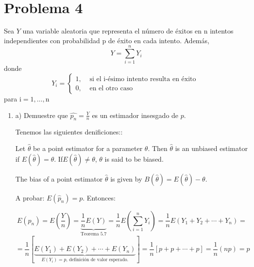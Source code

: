 \section{Problema 4}

Sea $Y$ una variable aleatoria que representa el número de éxitos en $\mathrm{n}$ intentos independientes con probabilidad p de éxito en cada intento. Además,
$$
Y=\sum_{i=1}^{n} Y_{i}
$$
donde
$$
Y_{i}=\begin{cases}
	1  , & \text { si el i-ésimo intento resulta en éxito } \\
	0  , & \text { en el otro caso }
\end{cases}
$$
para $\mathrm{i}=1, \ldots, \mathrm{n}$
\begin{enumerate}
	\item a) Demuestre que $\widehat{p_{n}}=\frac{Y}{n}$ es un estimador insesgado de $p$.
	\begin{solution} Tenemos las siguientes denificiones:: 
		\begin{tcolorbox}[colback=gray!15,colframe=black!1!black,title=Definición 8.2 - Sesgo ]
			Let $\hat{\theta}$ be a point estimator for a parameter $\theta$. Then $\hat{\theta}$  is an unbiased estimator if $E(\hat{\theta})=\theta$. If$E(\hat{\theta})\neq \theta$, $\theta$ is said to be biased.
			\end{tcolorbox}
		
		\begin{tcolorbox}[colback=gray!15,colframe=black!1!black,title=Definición 8.3 - Sesgo ]
			The bias of a point estimator $\hat{\theta}$ is given by $B(\hat{\theta}) = E(\hat{\theta}) - \theta $.
		\end{tcolorbox}
	A probar: $E(\hat{p}_n)=p$.  Entonces:

	$$E(\hat{p}_n)=E\left(\frac{Y}{n}\right)=\underbrace{\frac{1}{n}E(Y)}_{\text{Teorema 5.7}}=\frac{1}{n}E\left(\sum_{i=1}^{n}Y_i\right)=\frac{1}{n}E\left(Y_1+Y_2+\cdots +Y_n\right)=$$
	$$=\frac{1}{n}\left[\underbrace{E(Y_1)+E(Y_2)+\cdots + E(Y_n)}_{E(Y_i)=p \text{, definición de valor esperado.}}\right]=\frac{1}{n}\left[p+p+\cdots+p\right]=\frac{1}{n}(np)=p$$
	

\end{solution}
\end{enumerate}
